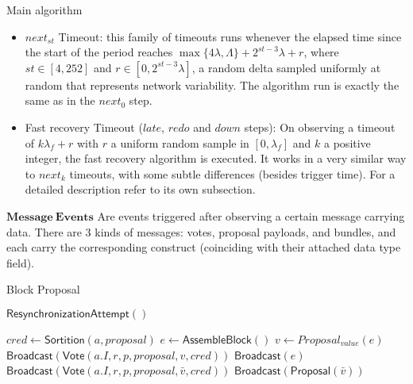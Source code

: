 \documentclass[10pt,a4paper]{article}
\begin{document}
\begin{section}{Main algorithm}
\begin{itemize}
    \item $next_{st}$ Timeout: this family of timeouts runs whenever the elapsed time since the start of the period reaches
    $\max\{4\lambda, \Lambda \} + 2^{st-3}\lambda + r$, where $st\in [4, 252]$ and $r \in [0, 2^{st-3}\lambda]$, a random 
    delta sampled uniformly at random that represents network variability.
    The algorithm run is exactly the same as in the $next_0$ step.

    \item Fast recovery Timeout ($late$, $redo$ and $down$ steps): On observing a timeout of $k\lambda_f + r$ with $r$ a uniform random sample in $[0, \lambda_f]$ and
    $k$ a positive integer, the fast recovery algorithm is executed. It works in a very similar way to $next_k$ timeouts, with some subtle differences (besides trigger time).
    For a detailed description refer to its own subsection.
\end{itemize}


$\mathbf{Message \ Events}$ Are events triggered after observing a certain message carrying data.
There are 3 kinds of messages: votes, proposal payloads, and bundles, and each carry
the corresponding construct (coinciding with their attached data type field).

\begin{subsection}{Block Proposal}\label{ssect:blockproposal}

    \begin{algorithm}
        \caption{\underline{Block proposal}}
        \label{algo:block-proposal}
        \begin{algorithmic}[1]

            \State $\mathsf{ResynchronizationAttempt}()$

                \State $cred \gets 
                \mathsf{Sortition}(a, proposal)$
                        \State $e \gets \mathsf{AssembleBlock}()$
                        \State $v \gets Proposal_{value}(e)$
                        \State $\mathsf{Broadcast}(\mathsf{Vote}(a.I, r, p, proposal, v, cred))$
                        \State $\mathsf{Broadcast}(e)$
                    \Else
                        \State $\mathsf{Broadcast}(\mathsf{Vote}(a.I, r, p, proposal, \bar{v}, cred))$
                            \State $\mathsf{Broadcast}(\mathsf{Proposal}(\bar{v}))$
                        \EndIf
                    \EndIf
                \EndIf
            \EndFor
        \EndFunction
        \end{algorithmic}
    \end{algorithm}


\end{subsection}
\end{section}
\end{document}
